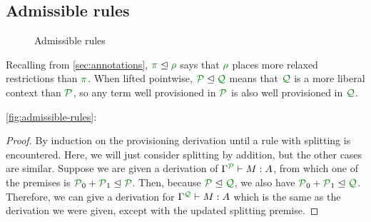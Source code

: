 \subsection{Admissible rules}
\label{sec:admissible}

\begin{figure}
  \caption{Admissible rules}
  \label{fig:admissible-rules}
\end{figure}


Recalling from \autoref{sec:annotations}, $\rescomment \pi \subres \rescomment
\rho$ says that $\rescomment \rho$ places more relaxed restrictions than
$\rescomment \pi$.
When lifted pointwise, $\resctx P \subres \resctx Q$ means that
$\resctx Q$ is a more liberal context than $\resctx
 P$, so any term well provisioned in $\resctx P$ is also well
provisioned in $\resctx Q$.

\begin{lemma}
  \autoref{fig:admissible-rules}: 
\end{lemma}
\begin{proof}
  By induction on the provisioning derivation until a rule with splitting is
  encountered.
  Here, we will just consider splitting by addition, but the other cases are
  similar.
  Suppose we are given a derivation of $\ctx{\Gamma}{P} \vdash M : A$,
  from which one of the premises is
  $\resctx P_0 + \resctx P_1 \subres \resctx P$.
  Then, because $\resctx P \subres \resctx Q$, we also have
  $\resctx P_0 + \resctx P_1 \subres \resctx Q$.
  Therefore, we can give a derivation for
  $\ctx{\Gamma}{Q} \vdash M : A$ which is the same as the derivation we
  were given, except with the updated splitting premise.
\end{proof}

